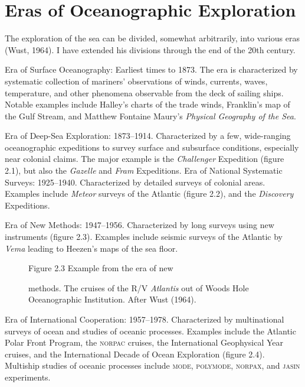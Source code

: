 \section{Eras of Oceanographic Exploration}
The exploration of the
sea can be divided, somewhat arbitrarily, into various eras (Wust,
1964). I have extended his divisions through the end of the 20th
century.
\begin{enumerate}
\vitem Era of Surface Oceanography: Earliest times to 1873. The era is
characterized by systematic collection of mariners' observations of winds,
currents, waves, temperature, and other phenomena observable from the
deck of sailing ships. Notable examples include Halley's charts of the trade
winds, Franklin's map of the Gulf Stream, and Matthew Fontaine Maury's
\textit{Physical Geography of the Sea}.

\vitem Era of Deep-Sea Exploration: 1873--1914.
Characterized by a few, wide-ranging oceanographic expeditions to survey surface
and subsurface conditions, especially near colonial claims. The major example is the
\textit{Challenger} Expedition (figure 2.1), but also the \textit{Gazelle} and
\textit{Fram} Expeditions.
\vitem Era of National Systematic Surveys: 1925--1940.
Characterized by detailed surveys of colonial areas. Examples include
\textit{Meteor} surveys of the Atlantic (figure 2.2), and the \textit{Discovery}
Expeditions.

\vitem Era of New Methods: 1947--1956.
Characterized by long surveys using new instruments (figure 2.3). Examples
include seismic surveys of the Atlantic by \textit{Vema} leading to Heezen's
maps of the sea floor.

\begin{figure}[t!]
\centering
\footnotesize
Figure 2.3  Example from the era of new \rule{0pt}{4ex}methods. The cruises of
the R/V \textit{Atlantis} out of Woods Hole Oceanographic Institution. After Wust
(1964).

\label{fig:Fig2-3}
\vspace{-3ex}
\end{figure}

\vitem Era of International Cooperation: 1957--1978. Characterized by
multinational surveys of ocean and studies of oceanic processes. Examples
include the Atlantic Polar Front Program, the \textsc{norpac} cruises, the
International Geophysical Year cruises, and the International Decade of Ocean
Exploration (figure 2.4). Multiship studies of oceanic processes include
\textsc{mode}, \textsc{polymode}, \textsc{norpax}, and \textsc{jasin}
experiments.


\end{enumerate}
